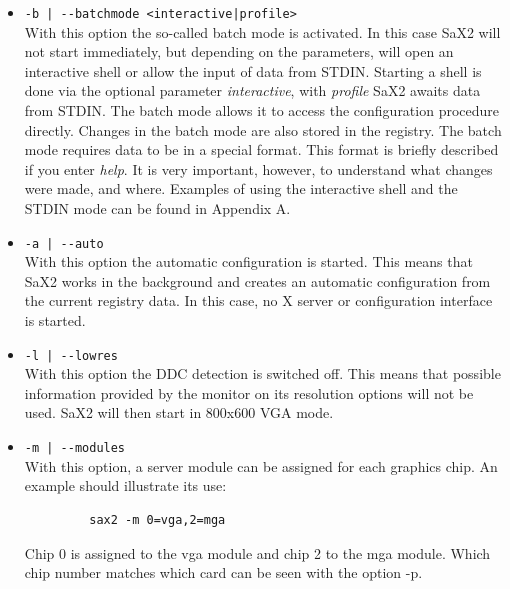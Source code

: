 \begin{itemize}
\item \verb+-b | --batchmode <interactive|profile>+\\
      With this option the so-called batch mode is activated.
      In this case SaX2 will not start immediately, but depending on the
      parameters, will open an interactive shell or allow the input of data
      from STDIN. Starting a shell is done via the optional parameter 
      \textit{interactive}, with \textit{profile} SaX2 awaits data from STDIN. 
      The batch mode allows it to access the configuration procedure directly. 
      Changes in the batch mode are also stored in the registry.
      The batch mode requires data to be in a special format. This format is
      briefly described if you enter \textit{help}. It is very important,
      however, to understand what changes were made, and where. Examples of
      using the interactive shell and the STDIN mode can be found in Appendix
      A. 
      
\item \verb+-a | --auto+\\
      With this option the automatic configuration is started. This means that
      SaX2 works in the background and creates an automatic configuration from
      the current registry data. In this case, no X server or  
      configuration interface is started. 

\item \verb+-l | --lowres+\\
      With this option the DDC detection is switched off. This means that
      possible information provided by the monitor on its resolution options
      will not be used. SaX2 will then start in 800x600 VGA mode.

\item \verb+-m | --modules+\\
      With this option, a server module can be assigned for each graphics
      chip. An example should illustrate its use:
      \begin{verbatim}
         sax2 -m 0=vga,2=mga 
      \end{verbatim}
      Chip 0 is assigned to the vga module and chip 2 to the mga module. Which
      chip number matches which card can be seen with the option -p. 
      

\end{itemize}
